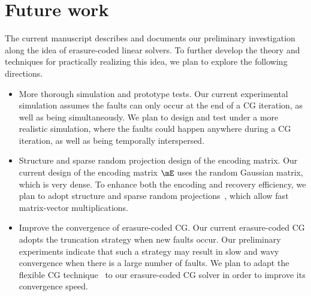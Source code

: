 \documentclass[11pt]{article}
\begin{document}
\section{Future work}

The current manuscript describes and documents our preliminary investigation
along the idea of erasure-coded linear solvers. To further develop the theory and
techniques for practically realizing this idea, we plan to explore the following directions.
\begin{itemize}
\item More thorough simulation and prototype tests. Our current experimental simulation
assumes the faults can only occur at the end of a CG iteration, as well as being
simultaneously. We plan to design and test under a more realistic simulation,
where the faults could happen anywhere during a CG iteration, as well as being
temporally interspersed.
\item Structure and sparse random projection design of the encoding matrix.
Our current design of the encoding matrix $\mE$ uses the random Gaussian matrix,
which is very dense. To enhance both the encoding and recovery efficiency, we plan
to adopt structure and sparse random projections~\cite{ClarksonDMMMW:2013,FoucartR:2013,MengM:2013},
which allow fast matrix-vector multiplications.
\item Improve the convergence of erasure-coded CG. Our current erasure-coded CG
adopts the truncation strategy when new faults occur. Our preliminary experiments
indicate that such a strategy may result in slow and wavy convergence when there
is a large number of faults. We plan to adapt the flexible CG technique~\cite{Notay:2000}
to our erasure-coded CG solver in order to improve its convergence speed.
\end{itemize}



\end{document}

